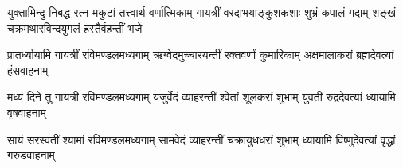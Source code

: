 \begin{center}
{युक्तामिन्दु-निबद्ध-रत्न-मकुटां तत्त्वार्थ-वर्णात्मिकाम्}
{गायत्रीं वरदाभयाङ्कुशकशाः शुभ्रं कपालं गदाम्}
{शङ्खं चक्रमथारविन्दयुगलं हस्तैर्वहन्तीं भजे}

\threelineshloka
{प्रातर्ध्यायामि गायत्रीं रविमण्डलमध्यगाम्}
{ऋग्वेदमुच्चारयन्तीं रक्तवर्णां कुमारिकाम्}
{अक्षमालाकरां ब्रह्मदेवत्यां हंसवाहनाम्}

\threelineshloka
{मध्यं दिने तु गायत्री रविमण्डलमध्यगाम्}
{यजुर्वेदं व्याहरन्तीं श्वेतां शूलकरां शुभाम्}
{युवतीं रुद्रदेवत्यां ध्यायामि वृषवाहनाम्}

\threelineshloka
{सायं सरस्वतीं श्यामां रविमण्डलमध्यगाम्}
{सामवेदं व्याहरन्तीं चक्रायुधधरां शुभाम्}
{ध्यायामि विष्णुदेवत्यां वृद्धां गरुडवाहनाम्}







\end{center}

